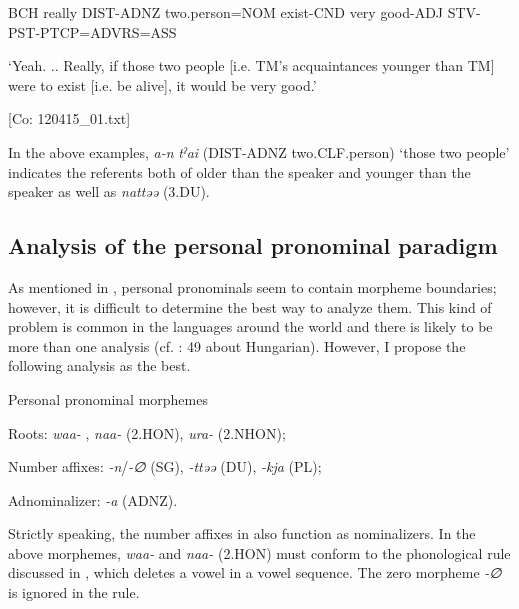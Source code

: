     BCH  really  DIST-ADNZ  two.person=NOM  exist-CND  very   good-ADJ  STV-PST-PTCP=ADVRS=ASS

    ‘Yeah. .. Really, if those two people [i.e. TM’s acquaintances younger than TM] were to exist [i.e. be alive], it would be very good.’

    [Co: 120415\_01.txt]
\z
\z

In the above examples, \textit{a-n} \textit{tˀai} (DIST-ADNZ two.CLF.person) ‘those two people’ indicates the referents both of older than the speaker and younger than the speaker as well as \textit{nattəə} (3.DU).

\subsection{Analysis of the personal pronominal paradigm}

As mentioned in , personal pronominals seem to contain morpheme boundaries; however, it is difficult to determine the best way to analyze them. This kind of problem is common in the languages around the world and there is likely to be more than one analysis (cf. \citealt{Comrie1989}: 49 about Hungarian). However, I propose the following analysis as the best.

\ea \label{ex:5:14}  Personal pronominal morphemes

Roots:      \textit{waa-} , \textit{naa-} (2.HON), \textit{ura-} (2.NHON);

Number affixes:  \textit{{}-n}/\textit{{}-∅} (SG), \textit{{}-ttəə} (DU), \textit{{}-kja} (PL);

Adnominalizer:  \textit{{}-a} (ADNZ).
\z

Strictly speaking, the number affixes in  also function as nominalizers. In the above morphemes, \textit{waa-}  and \textit{naa-} (2.HON) must conform to the phonological rule discussed in , which deletes a vowel in a vowel sequence. The zero morpheme \textit{{}-∅} is ignored in the rule.

